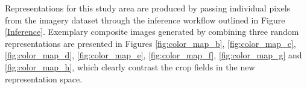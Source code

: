 \documentclass[journal,article,submit,pdftex,moreauthors]{Definitions/mdpi}
\begin{document}
Representations for this study area are produced by passing individual pixels from the imagery dataset through the inference workflow outlined in Figure \ref{Inference}. Exemplary composite images generated by combining three random representations are presented in Figures \ref{fig:color_map_b}, \ref{fig:color_map_c}, \ref{fig:color_map_d}, \ref{fig:color_map_e}, \ref{fig:color_map_f}, \ref{fig:color_map_g} and \ref{fig:color_map_h}, which clearly contrast the crop fields in the new representation space.
\end{document}
